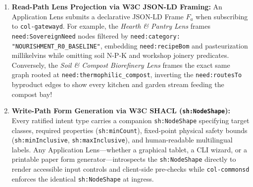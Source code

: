 \begin{enumerate}
    \item \textbf{Read-Path Lens Projection via W3C JSON-LD Framing:} An Application Lens submits a declarative JSON-LD Frame $F_a$ when subscribing to \texttt{col-gatewayd}. For example, the \textit{Hearth \& Pantry Lens} frames \texttt{need:SovereignNeed} nodes filtered by \texttt{need:category: "NOURISHMENT\_R0\_BASELINE"}, embedding \texttt{need:recipeBom} and pasteurization millikelvins while omitting soil N-P-K and workshop joinery predicates. Conversely, the \textit{Soil \& Compost Biorefinery Lens} frames the exact same graph rooted at \texttt{need:thermophilic\_compost}, inverting the \texttt{need:routesTo} byproduct edges to show every kitchen and garden stream feeding the compost bay!
    \item \textbf{Write-Path Form Generation via W3C SHACL (\texttt{sh:NodeShape}):} Every ratified intent type carries a companion \texttt{sh:NodeShape} specifying target classes, required properties (\texttt{sh:minCount}), fixed-point physical safety bounds (\texttt{sh:minInclusive}, \texttt{sh:maxInclusive}), and human-readable multilingual labels. Any Application Lens---whether a graphical tablet, a CLI wizard, or a printable paper form generator---introspects the \texttt{sh:NodeShape} directly to render accessible input controls and client-side pre-checks while \texttt{col-commonsd} enforces the identical \texttt{sh:NodeShape} at ingress.
\end{enumerate}

